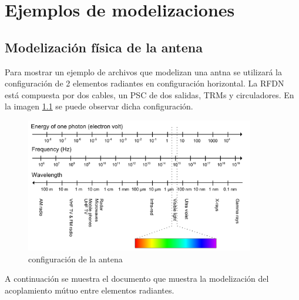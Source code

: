 
\chapter{Ejemplos de modelizaciones} %

\label{AppendixC} %


\section{Modelización física de la antena}

Para mostrar un ejemplo de archivos que modelizan una antna se utilizará la configuración de 2 elementos radiantes en 
configuración horizontal. La RFDN está compuesta por dos cables, un PSC de dos salidas, TRMs y circuladores. En la imagen 
\ref{fig:RFDN_configuration} se puede observar dicha configuración.

\begin{figure}[H]
 \centering
 \includegraphics[width=10cm]{gfx/electromagneticSpectrum.png}
 \caption{configuración de la antena}
 \label{fig:RFDN_configuration}
\end{figure}


A continuación se muestra el documento que muestra la modelización del acoplamiento mútuo entre elementos radiantes.


